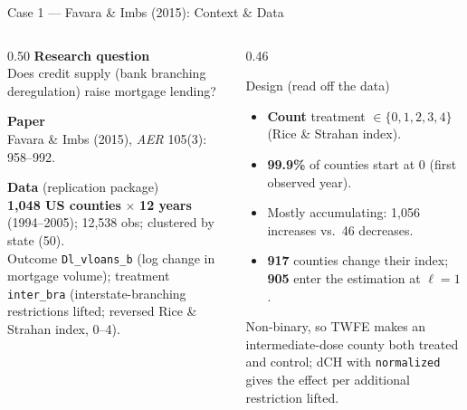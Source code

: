 \documentclass[main.tex]{subfiles}
\begin{document}
\begin{frame}{Case 1 --- Favara \& Imbs (2015): Context \& Data}

  \begin{columns}[T]
    \begin{column}{0.50\textwidth}
      \textbf{Research question}\\
      Does credit supply (bank branching deregulation) raise mortgage
      lending?

      \medskip
      \textbf{Paper}\\
      Favara \& Imbs (2015), \textit{AER} 105(3): 958--992.

      \medskip
      \textbf{Data} (replication package)\\
      \textbf{1{,}048 US counties} $\times$ \textbf{12 years} (1994--2005);
      12{,}538 obs; clustered by state (50).\\[3pt]
      Outcome \texttt{Dl\_vloans\_b} (log change in mortgage volume);
      treatment \texttt{inter\_bra} (interstate-branching restrictions
      lifted; reversed Rice \& Strahan index, 0--4).
    \end{column}
    \begin{column}{0.46\textwidth}
      \begin{block}{Design (read off the data)}
        \footnotesize
        \begin{itemize}\footnotesize
          \item \textbf{Count} treatment $\in\{0,1,2,3,4\}$ (Rice \&
            Strahan index).
          \item \textbf{99.9\%} of counties start at 0 (first observed year).
          \item Mostly accumulating: 1{,}056 increases vs.\ 46 decreases.
          \item \textbf{917} counties change their index; \textbf{905} enter the estimation at $\ell=1$.
        \end{itemize}
      \end{block}

      \smallskip
      \footnotesize Non-binary, so TWFE makes an intermediate-dose county both
      treated and control; dCH with \texttt{normalized} gives the effect per
      additional restriction lifted.
    \end{column}
  \end{columns}

\end{frame}
\end{document}
